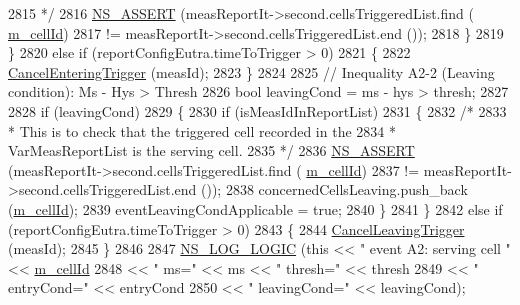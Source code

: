 \begin{DoxyCode}
2815 \textcolor{comment}{                 */}
2816                 \hyperlink{assert_8h_a6dccdb0de9b252f60088ce281c49d052}{NS\_ASSERT} (measReportIt->second.cellsTriggeredList.find (
      \hyperlink{classns3_1_1LteUeRrc_aa9d3317734eea9158371d9fccf3a0c48}{m\_cellId})
2817                            != measReportIt->second.cellsTriggeredList.end ());
2818               \}
2819           \}
2820         \textcolor{keywordflow}{else} \textcolor{keywordflow}{if} (reportConfigEutra.timeToTrigger > 0)
2821           \{
2822             \hyperlink{classns3_1_1LteUeRrc_a9221d85411de5dd375b71b44e3331c5c}{CancelEnteringTrigger} (measId);
2823           \}
2824 
2825         \textcolor{comment}{// Inequality A2-2 (Leaving condition): Ms - Hys > Thresh}
2826         \textcolor{keywordtype}{bool} leavingCond = ms - hys > thresh;
2827 
2828         \textcolor{keywordflow}{if} (leavingCond)
2829           \{
2830             \textcolor{keywordflow}{if} (isMeasIdInReportList)
2831               \{
2832                 \textcolor{comment}{/*}
2833 \textcolor{comment}{                 * This is to check that the triggered cell recorded in the}
2834 \textcolor{comment}{                 * VarMeasReportList is the serving cell.}
2835 \textcolor{comment}{                 */}
2836                 \hyperlink{assert_8h_a6dccdb0de9b252f60088ce281c49d052}{NS\_ASSERT} (measReportIt->second.cellsTriggeredList.find (
      \hyperlink{classns3_1_1LteUeRrc_aa9d3317734eea9158371d9fccf3a0c48}{m\_cellId})
2837                            != measReportIt->second.cellsTriggeredList.end ());
2838                 concernedCellsLeaving.push\_back (\hyperlink{classns3_1_1LteUeRrc_aa9d3317734eea9158371d9fccf3a0c48}{m\_cellId});
2839                 eventLeavingCondApplicable = \textcolor{keyword}{true};
2840               \}
2841           \}
2842         \textcolor{keywordflow}{else} \textcolor{keywordflow}{if} (reportConfigEutra.timeToTrigger > 0)
2843           \{
2844             \hyperlink{classns3_1_1LteUeRrc_a3e35c475cfb5361222f1556bfbd3111d}{CancelLeavingTrigger} (measId);
2845           \}
2846 
2847         \hyperlink{group__logging_ga88acd260151caf2db9c0fc84997f45ce}{NS\_LOG\_LOGIC} (\textcolor{keyword}{this} << \textcolor{stringliteral}{" event A2: serving cell "} << \hyperlink{classns3_1_1LteUeRrc_aa9d3317734eea9158371d9fccf3a0c48}{m\_cellId}
2848                            << \textcolor{stringliteral}{" ms="} << ms << \textcolor{stringliteral}{" thresh="} << thresh
2849                            << \textcolor{stringliteral}{" entryCond="} << entryCond
2850                            << \textcolor{stringliteral}{" leavingCond="} << leavingCond);

\end{DoxyCode}
